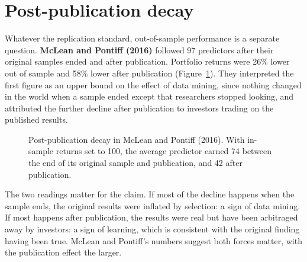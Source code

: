 \section{Post-publication decay}
\label{sec:10-decay}

Whatever the replication standard, out-of-sample performance is a separate question. \textbf{McLean and Pontiff (2016)} followed 97 predictors after their original samples ended and after publication. Portfolio returns were 26\% lower out of sample and 58\% lower after publication (Figure~\ref{fig:10-decay}). They interpreted the first figure as an upper bound on the effect of data mining, since nothing changed in the world when a sample ended except that researchers stopped looking, and attributed the further decline after publication to investors trading on the published results.

\begin{figure}[htbp]
\centering
{}
\caption{Post-publication decay in McLean and Pontiff (2016). With in-sample returns set to 100, the average predictor earned 74 between the end of its original sample and publication, and 42 after publication.}
\label{fig:10-decay}
\end{figure}

The two readings matter for the claim. If most of the decline happens when the sample ends, the original results were inflated by selection: a sign of data mining. If most happens after publication, the results were real but have been arbitraged away by investors: a sign of learning, which is consistent with the original finding having been true. McLean and Pontiff's numbers suggest both forces matter, with the publication effect the larger.

